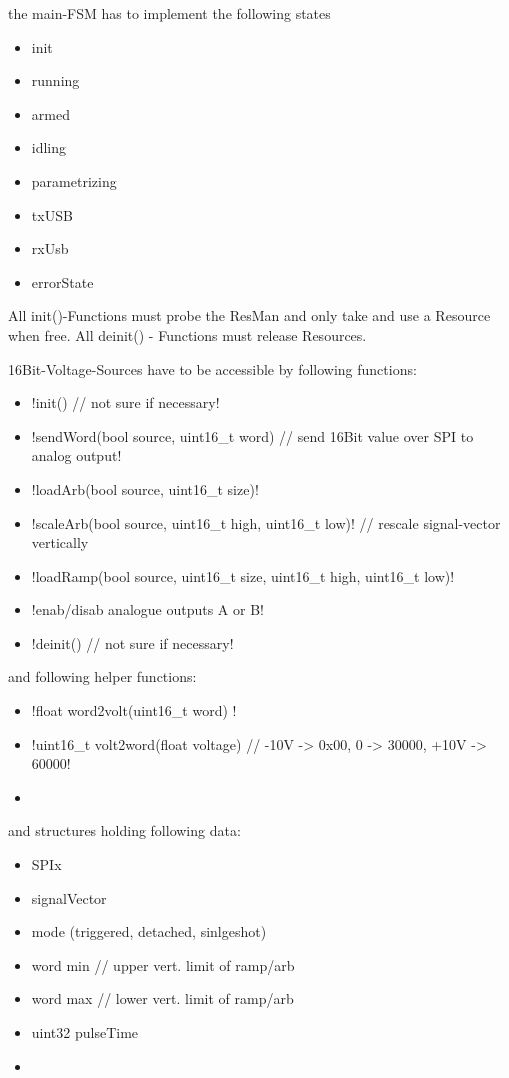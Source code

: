 	{	the main-FSM has to implement the following states
		\begin{itemize}
		\item init
		\item running
		\item armed
		\item idling
		\item parametrizing 
		\item txUSB
		\item rxUsb
		\item errorState
		\end{itemize}
	}

	{ All init()-Functions must probe the ResMan and only take and use a Resource when free. All deinit() - Functions must release Resources.}

	{	16Bit-Voltage-Sources have to be accessible by following functions:
		\begin{itemize}
		\item 	\lstC !init() // not sure if necessary!
		\item 	\lstC !sendWord(bool source, uint16_t word)		// send 16Bit value over SPI to analog output!
		\item 	\lstC !loadArb(bool source, uint16_t size)!
		\item 	\lstC !scaleArb(bool source, uint16_t high, uint16_t low)! // rescale signal-vector vertically
		\item 	\lstC !loadRamp(bool source, uint16_t size, uint16_t high, uint16_t low)!
		\item 	\lstC !enab/disab analogue outputs A or B!
		\item 	\lstC !deinit() // not sure if necessary!
		\end{itemize}

		and following helper functions:
		\begin{itemize} \setlength\itemsep{1px}
			\item 	\lstC !float word2volt(uint16_t word) !
			\item 	\lstC !uint16_t	volt2word(float voltage) // -10V -> 0x00, 0 -> 30000, +10V -> 60000!
		\item 
		\end{itemize}

		and structures holding following data:
		\begin{itemize} \setlength\itemsep{1px}
		\item SPIx
		\item signalVector
		\item mode (triggered, detached, sinlgeshot)
		\item word min // upper vert. limit of ramp/arb
		\item word max // lower vert. limit of ramp/arb
		\item uint32	pulseTime
		\item 
		\end{itemize}
		
	}

